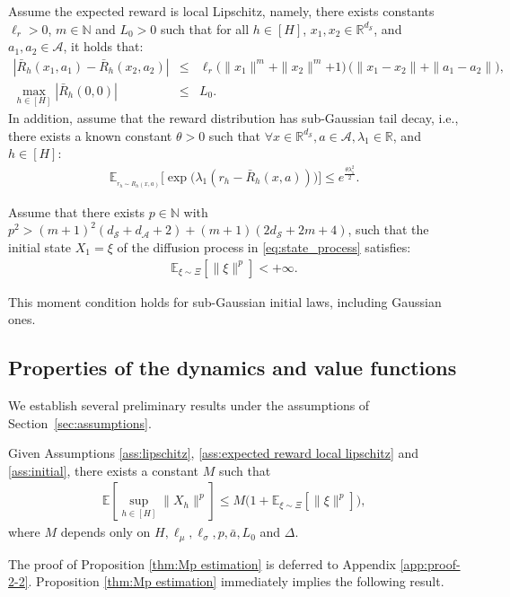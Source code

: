 \documentclass[final,supplement]{siamart251216}
\begin{document}
\begin{assumption}\label{ass:expected reward local lipschitz}
Assume the expected reward is local Lipschitz, namely,  there exists  constants $\ell_{r}>0$, $m\in \mathbb{N}$ and $L_{0}> 0$ such that for all $h\in [H]$, $ x_1,x_2 \in \mathbb{R}^{d_{\mathcal{S}}}$, and $ a_1,a_2\in \mathcal{A}$, it holds that:
    \begin{eqnarray*}
    |\bar{R}_{h}(x_1,a_1)-\bar{R}_{h}(x_2,a_2)|&\leq&
{\ell_{r}\Big(\|x_1\|^m+\|x_2\|^m{+1}\Big)\,\Big(\|x_1-x_2\|+\|a_1-a_2\|\Big)},\nonumber\\
     \max_{h\in[H]}|\bar{R}_{h}(0,0)|&\leq&L_{0}.\label{ass-eqn:expected reward local lipschitz}
     \end{eqnarray*}
 In addition, assume that the reward distribution has sub-Gaussian tail decay, i.e., there exists a known constant $\theta>0$ such that $\forall x \in \mathbb{R}^{d_{\mathcal{S}}}, a \in \mathcal{A}, \lambda_{1} \in \mathbb{R}$, and $h \in [H]$:
 \begin{eqnarray}\label{ass-eqn:subGaussian reward}
    \mathbb{E}_{_{r_h\sim R_h(x,a)}}\Big[\exp\Big(\lambda_{1}(r_{h}-\bar{R}_{h}(x,a))\Big)\Big]\leq e^{\frac{\theta \lambda_{1}^2}{2}}.
\end{eqnarray}
\end{assumption}



\begin{assumption}\label{ass:initial} 
Assume that there exists $p\in \mathbb{N}$ with $p^{2}>(m+1)^{2}(d_{\mathcal{S}}+d_{\mathcal{A}}+2)+(m+1)(2d_{\mathcal{S}}+2m+4)$, such that the initial state $X_{1}=\xi$ of the diffusion process in \eqref{eq:state_process}  satisfies: 
\begin{eqnarray*}
    \mathbb{E}_{\xi\sim \Xi}[\|\xi\|^{p}]<+\infty.
\end{eqnarray*}
\end{assumption}
This moment condition holds for sub-Gaussian initial laws, including Gaussian ones.

\subsection{Properties of the dynamics and value functions}
\label{sec:properties}
We establish several preliminary results under the assumptions of
Section~\ref{sec:assumptions}.

\begin{proposition}\label{thm:Mp estimation}
Given Assumptions \ref{ass:lipschitz}, \ref{ass:expected reward local lipschitz} and \ref{ass:initial},  there exists a constant $M$ such that 
\begin{eqnarray*}
\mathbb{E}\left[\sup_{h\in[H]}\|X_{h}\|^{p}\right]\leq M\Big(1+\mathbb{E}_{\xi\sim \Xi}[\|\xi\|^{p}]\Big),
\end{eqnarray*}
where $M$ depends only on $H,\ell_{\mu},\ell_{\sigma},p,\bar{a},L_{0}$ and $\Delta$. 
\end{proposition}
The proof of Proposition \ref{thm:Mp estimation} is deferred to Appendix \ref{app:proof-2-2}. Proposition \ref{thm:Mp estimation} immediately implies the following result.
\end{document}
